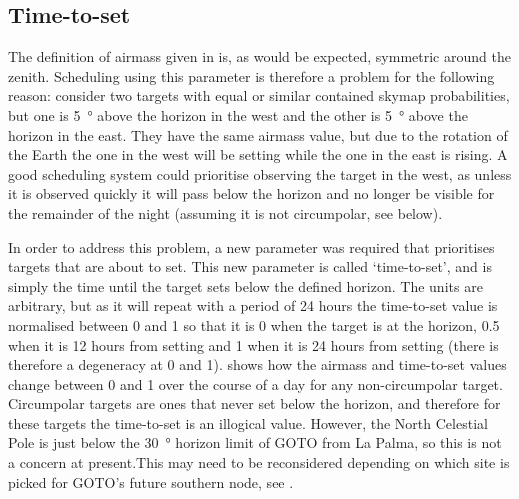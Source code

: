 \subsection{Time-to-set}
\label{sec:tts}
\begin{colsection}

The definition of airmass given in  is, as would be expected, symmetric around the zenith. Scheduling using this parameter is therefore a problem for the following reason: consider two targets with equal or similar contained skymap probabilities, but one is \SI{5}{\degree} above the horizon in the west and the other is \SI{5}{\degree} above the horizon in the east. They have the same airmass value, but due to the rotation of the Earth the one in the west will be setting while the one in the east is rising. A good scheduling system could prioritise observing the target in the west, as unless it is observed quickly it will pass below the horizon and no longer be visible for the remainder of the night (assuming it is not circumpolar, see below).

In order to address this problem, a new parameter was required that prioritises targets that are about to set. This new parameter is called `time-to-set', and is simply the time until the target sets below the defined horizon. The units are arbitrary, but as it will repeat with a period of 24 hours the time-to-set value is normalised between 0 and 1 so that it is 0 when the target is at the horizon, 0.5 when it is 12 hours from setting and 1 when it is 24 hours from setting (there is therefore a degeneracy at 0 and 1).  shows how the airmass and time-to-set values change between 0 and 1 over the course of a day for any non-circumpolar target. Circumpolar targets are ones that never set below the horizon, and therefore for these targets the time-to-set is an illogical value. However, the North Celestial Pole is just below the \SI{30}{\degree} horizon limit of GOTO from La Palma, so this is not a concern at present.\@ This may need to be reconsidered depending on which site is picked for GOTO's future southern node, see .


\end{colsection}
